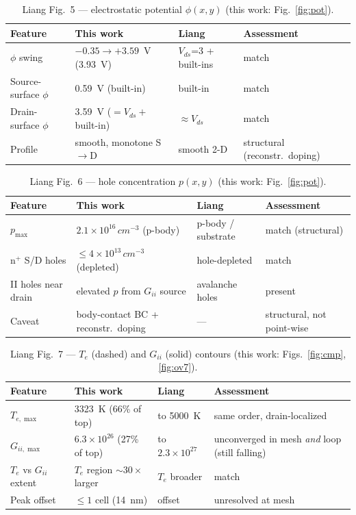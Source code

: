 \documentclass[11pt]{article}
\begin{document}
\begin{table}[h]\centering\small
\caption{Liang Fig.~5 --- electrostatic potential $\phi(x,y)$ (this work: Fig.~\ref{fig:pot}).}\label{tab:f5}
\begin{tabular}{p{3.5cm}p{3.9cm}p{2.9cm}p{3.2cm}}
\toprule
Feature & This work & Liang & Assessment \\
\midrule
$\phi$ swing & $-0.35\to+3.59$~V (3.93~V) & $V_{ds}$=3 + built-ins & match \\
Source-surface $\phi$ & \SI{0.59}{V} (built-in) & built-in & match \\
Drain-surface $\phi$ & \SI{3.59}{V} ($=V_{ds}+$built-in) & $\approx\!V_{ds}$ & match \\
Profile & smooth, monotone S$\to$D & smooth 2-D & structural (reconstr.\ doping) \\
\bottomrule
\end{tabular}
\end{table}

\begin{table}[h]\centering\small
\caption{Liang Fig.~6 --- hole concentration $p(x,y)$ (this work: Fig.~\ref{fig:pot}).}\label{tab:f6}
\begin{tabular}{p{3.5cm}p{3.9cm}p{2.9cm}p{3.2cm}}
\toprule
Feature & This work & Liang & Assessment \\
\midrule
$p_{\max}$ & $2.1\times10^{16}\,\si{cm^{-3}}$ (p-body) & p-body / substrate & match (structural) \\
n$^+$ S/D holes & $\le\!4\times10^{13}\,\si{cm^{-3}}$ (depleted) & hole-depleted & match \\
II holes near drain & elevated $p$ from $G_{ii}$ source & avalanche holes & present \\
Caveat & body-contact BC + reconstr.\ doping & --- & structural, not point-wise \\
\bottomrule
\end{tabular}
\end{table}

\begin{table}[h]\centering\small
\caption{Liang Fig.~7 --- $T_e$ (dashed) and $G_{ii}$ (solid) contours (this work: Figs.~\ref{fig:cmp},\ref{fig:ov7}).}\label{tab:f7}
\begin{tabular}{p{3.5cm}p{3.9cm}p{2.9cm}p{3.2cm}}
\toprule
Feature & This work & Liang & Assessment \\
\midrule
$T_{e,\max}$ & \SI{3323}{K} (66\% of top) & to \SI{5000}{K} & same order, drain-localized \\
$G_{ii,\max}$ & $6.3\times10^{26}$ (27\% of top) & to $2.3\times10^{27}$ & unconverged in mesh \emph{and} loop (still falling) \\
$T_e$ vs $G_{ii}$ extent & $T_e$ region $\sim\!30\times$ larger & $T_e$ broader & match \\
Peak offset & $\le\!1$ cell (14~nm) & offset & unresolved at mesh \\
\bottomrule
\end{tabular}
\end{table}
\end{document}
